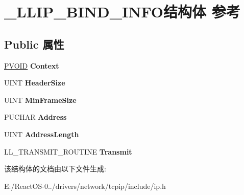 \hypertarget{struct___l_l_i_p___b_i_n_d___i_n_f_o}{}\section{\+\_\+\+L\+L\+I\+P\+\_\+\+B\+I\+N\+D\+\_\+\+I\+N\+F\+O结构体 参考}
\label{struct___l_l_i_p___b_i_n_d___i_n_f_o}
\subsection*{Public 属性}
\begin{DoxyCompactItemize}
\item 
\mbox{\label{struct___l_l_i_p___b_i_n_d___i_n_f_o_a95ce3b19a05fa2ada2de313acdcf1e93}} 
\hyperlink{interfacevoid}{P\+V\+O\+ID} {\bfseries Context}
\item 
\mbox{\label{struct___l_l_i_p___b_i_n_d___i_n_f_o_abaec6b99c45fc16a5ffd9eae16860627}} 
U\+I\+NT {\bfseries Header\+Size}
\item 
\mbox{\label{struct___l_l_i_p___b_i_n_d___i_n_f_o_a8962841bdf696ef3a24101ff8630f4af}} 
U\+I\+NT {\bfseries Min\+Frame\+Size}
\item 
\mbox{\label{struct___l_l_i_p___b_i_n_d___i_n_f_o_a0515ac399a667eab35036163cc7c0759}} 
P\+U\+C\+H\+AR {\bfseries Address}
\item 
\mbox{\label{struct___l_l_i_p___b_i_n_d___i_n_f_o_ac3bd45157547bd4f59ec5b67141a020f}} 
U\+I\+NT {\bfseries Address\+Length}
\item 
\mbox{\label{struct___l_l_i_p___b_i_n_d___i_n_f_o_ad93b0e8bdf4e23f79b8b5311716e8349}} 
L\+L\+\_\+\+T\+R\+A\+N\+S\+M\+I\+T\+\_\+\+R\+O\+U\+T\+I\+NE {\bfseries Transmit}
\end{DoxyCompactItemize}


该结构体的文档由以下文件生成\+:\begin{DoxyCompactItemize}
\item 
E\+:/\+React\+O\+S-\/0../drivers/network/tcpip/include/ip.\+h\end{DoxyCompactItemize}
